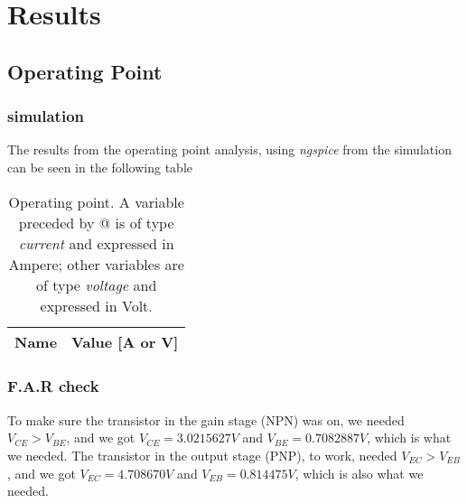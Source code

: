 \section{Results}
\label{sec:res}
\subsection{Operating Point}
\subsubsection{simulation}
The results from the operating point analysis, using \textit{ngspice} from the simulation can be seen in the following table
\begin{table}[H]
  \centering
  \begin{tabular}{|l|r|}
    \hline    
    {\bf Name} & {\bf Value [A or V]} \\ \hline
    
  \end{tabular}
  \caption{Operating point. A variable preceded by @ is of type {\em current}
    and expressed in Ampere; other variables are of type {\it voltage} and expressed in
    Volt.}
  \label{tab:op}
\end{table}
\subsubsection{F.A.R check}
To make sure the transistor in the gain stage (NPN) was on, we needed $V_{CE} > V_{BE}$, and we got $V_{CE}=3.0215627 V$ and $V_{BE}=0.7082887 V$, which is what we needed.
The transistor in the output stage (PNP), to work, needed $V_{EC} > V_{EB}$, and we got $V_{EC}=4.708670V$ and $V_{EB}=0.814475V$, which is also what we needed.

